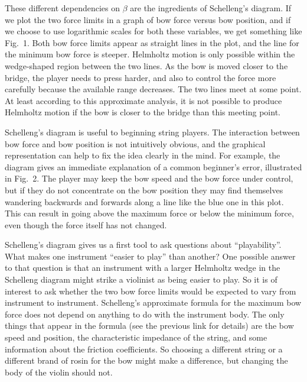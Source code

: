   These different dependencies on $\beta$ are the ingredients of Schelleng’s 
  diagram. If we plot the two force limits in a graph of bow force versus bow 
  position, and if we choose to use logarithmic scales for both these 
  variables, we get something like Fig.\ 1. Both bow force limits appear as 
  straight lines in the plot, and the line for the minimum bow force is 
  steeper. Helmholtz motion is only possible within the wedge-shaped region 
  between the two lines. As the bow is moved closer to the bridge, the player 
  needs to press harder, and also to control the force more carefully because 
  the available range decreases. The two lines meet at some point. At least 
  according to this approximate analysis, it is not possible to produce 
  Helmholtz motion if the bow is closer to the bridge than this meeting point. 


  Schelleng’s diagram is useful to beginning string players. The interaction 
  between bow force and bow position is not intuitively obvious, and the 
  graphical representation can help to fix the idea clearly in the mind. For 
  example, the diagram gives an immediate explanation of a common beginner’s 
  error, illustrated in Fig.\ 2. The player may keep the bow speed and the bow 
  force under control, but if they do not concentrate on the bow position they 
  may find themselves wandering backwards and forwards along a line like the 
  blue one in this plot. This can result in going above the maximum force or 
  below the minimum force, even though the force itself has not changed. 


  Schelleng’s diagram gives us a first tool to ask questions about 
  “playability”. What makes one instrument “easier to play” than another? One 
  possible answer to that question is that an instrument with a larger 
  Helmholtz wedge in the Schelleng diagram might strike a violinist as being 
  easier to play. So it is of interest to ask whether the two bow force limits 
  would be expected to vary from instrument to instrument. Schelleng’s 
  approximate formula for the maximum bow force does not depend on anything to 
  do with the instrument body. The only things that appear in the formula (see 
  the previous link for details) are the bow speed and position, the 
  characteristic impedance of the string, and some information about the 
  friction coefficients. So choosing a different string or a different brand of 
  rosin for the bow might make a difference, but changing the body of the 
  violin should not. 

